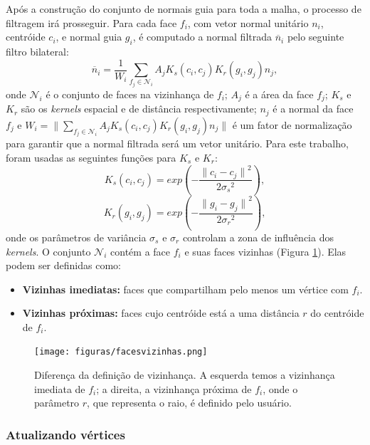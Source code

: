 Após a construção do conjunto de normais guia para toda a malha, o processo de filtragem irá prosseguir. Para cada face $f_i$, com vetor normal unitário $n_i$, centróide $c_i$, e normal guia $g_i$, é computado a normal filtrada $\overline{n}_i$ pelo seguinte filtro bilateral:
\begin{equation} \label{eq:filtrobilateraldasnormais}
    \overline{n}_i = \frac{1}{W_i}\sum_{f_j \in \mathcal{N}_i}{A_j K_s(c_i,c_j)K_r(g_i,g_j) n_j},
\end{equation}
onde $\mathcal{N}_i$ é o conjunto de faces na vizinhança de $f_i$; $A_j$ é a área da face $f_j$; $K_s$ e $K_r$ são os \textit{kernels} espacial e de distância respectivamente; $n_j$ é a normal da face $f_j$ e $W_i = \|\sum_{f_j \in \mathcal{N}_i}{A_j K_s(c_i,c_j)K_r(g_i,g_j) n_j}\|$ é um fator de normalização para garantir que a normal filtrada será um vetor unitário. Para este trabalho, foram usadas as seguintes funções para $K_s$ e $K_r$:
\begin{equation}
    K_s(c_i,c_j) = exp(-\frac{ {\| c_i-c_j \|}^2 }{ 2{\sigma_s}^2 }),
\end{equation}
\begin{equation}
    K_r(g_i,g_j) = exp(-\frac{ {\| g_i-g_j \|}^2 }{ 2{\sigma_r}^2 }),
\end{equation}
onde os parâmetros de variância $\sigma_s$ e $\sigma_r$ controlam a zona de influência dos \textit{kernels}. O conjunto $\mathcal{N}_i$ contém a face $f_i$ e suas faces vizinhas (Figura \ref{fig:facesvizinhas}). Elas podem ser definidas como:
\begin{itemize}
    \item \textbf{Vizinhas imediatas:} faces que compartilham pelo menos um vértice com $f_i$.
    \item \textbf{Vizinhas próximas:} faces cujo centróide está a uma distância $r$ do centróide de $f_i$.
\end{itemize}


\begin{figure}[!h]
\captionsetup{width=\linewidth}
\centering
\texttt{[image: figuras/facesvizinhas.png]}
\caption{Diferença da definição de vizinhança. A esquerda temos a vizinhança imediata de $f_i$; a direita, a vizinhança próxima de $f_i$, onde o parâmetro $r$, que representa o raio, é definido pelo usuário.}
\label{fig:facesvizinhas}
\end{figure}


\subsubsection{Atualizando vértices}

